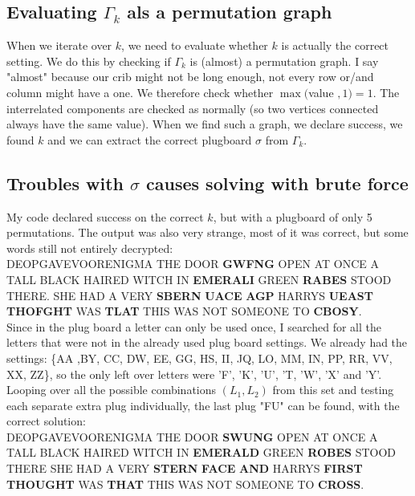 \documentclass{article}
\begin{document}
\subsection{Evaluating $\Gamma_k$ als a permutation graph}

When we iterate over $k$, we need to evaluate whether $k$ is actually the correct setting. We do this by checking if $\Gamma_k$ is (almost) a permutation graph. I say "almost" because our crib might not be long enough, not every row or/and column might have a one. We therefore check whether $\max ($value $,1) = 1$. The interrelated components are checked as normally (so two vertices connected always have the same value). When we find such a graph, we declare success, we found $k$ and we can extract the correct plugboard $\sigma$ from $\Gamma_k$.

\subsection{Troubles with $\sigma$ causes solving with brute force}

My code declared success on the correct $k$, but with a plugboard of only 5 permutations. The output was also very strange, most of it was correct, but some words still not entirely decrypted:\\

DEOPGAVEVOORENIGMA THE DOOR \textbf{GWFNG} OPEN AT ONCE A TALL BLACK HAIRED WITCH IN \textbf{EMERALI} GREEN \textbf{RABES} STOOD  THERE. SHE HAD A VERY \textbf{SBERN} \textbf{UACE} \textbf{AGP} HARRYS \textbf{UEAST} \textbf{THOFGHT} WAS \textbf{TLAT} THIS WAS NOT SOMEONE TO \textbf{CBOSY}.\\

Since in the plug board a letter can only be used once, I searched for all the letters that were not in the already used plug board settings. We already had the settings: \{AA ,BY, CC, DW, EE, GG, HS, II,
JQ, LO, MM, IN, PP, RR, VV, XX, ZZ\}, so the only left over letters were 'F', 'K', 'U', 'T, 'W', 'X' and 'Y'. Looping over all the possible combinations $(L_1, L_2)$ from this set and testing each separate extra plug individually, the last plug "FU" can be found, with the correct solution:\\

DEOPGAVEVOORENIGMA THE DOOR \textbf{SWUNG} OPEN AT ONCE A TALL BLACK HAIRED WITCH IN \textbf{EMERALD} GREEN \textbf{ROBES} STOOD THERE SHE HAD A VERY \textbf{STERN} \textbf{FACE} \textbf{AND} HARRYS \textbf{FIRST} \textbf{THOUGHT} WAS \textbf{THAT} THIS WAS NOT SOMEONE TO \textbf{CROSS}.\\
\end{document}
